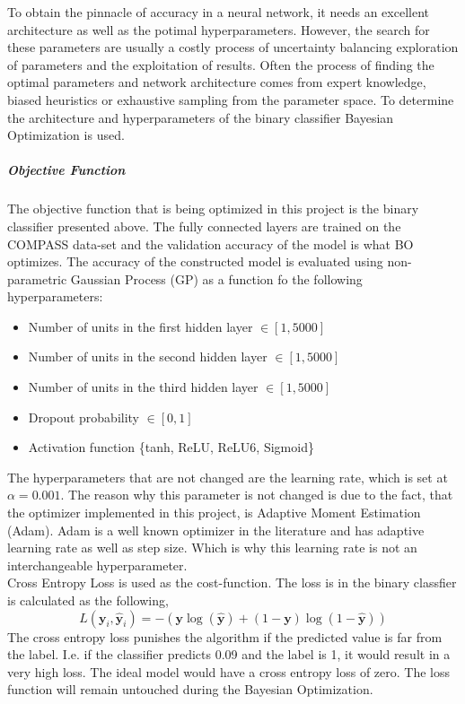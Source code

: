 \documentclass[11pt, fleqn, titlepage]{article}
\begin{document}
	To obtain the pinnacle of accuracy in a neural network, it needs an excellent architecture as well as the potimal hyperparameters. However, the search for these parameters are usually a costly process of uncertainty balancing exploration of parameters and the exploitation of results. Often the process of finding the optimal parameters and network architecture comes from expert knowledge, biased heuristics or exhaustive sampling from the parameter space. To determine the architecture and hyperparameters of the binary classifier Bayesian Optimization is used. 
	\subparagraph*{Objective Function}
	The objective function that is being optimized in this project is the binary classifier presented above. The fully connected layers are trained on the COMPASS data-set and the validation accuracy of the model is what BO optimizes. The accuracy of the constructed model is evaluated using non-parametric Gaussian Process (GP) as a function fo the following hyperparameters:
	\begin{itemize}
		\item Number of units in the first hidden layer \(\in [1, 5000]\) 
		\item Number of units in the second hidden layer \(\in [1, 5000]\) 
		\item Number of units in the third hidden layer \(\in [1, 5000]\)
		\item Dropout probability \(\in [0,1]\)
		\item Activation function \{tanh, ReLU, ReLU6, Sigmoid\}
	\end{itemize}
	The hyperparameters that are not changed are the learning rate, which is set at $ \alpha = 0.001 $. The reason why this parameter is not changed is due to the fact, that the optimizer implemented in this project, is Adaptive Moment Estimation (Adam). Adam is a well known optimizer in the literature and has adaptive learning rate as well as step size. Which is why this learning rate is not an interchangeable hyperparameter. \\ Cross Entropy Loss is used as the cost-function. The loss is in the binary classfier is calculated as the following, 
	\begin{equation}\label{key}
	L\left(\boldsymbol{y}_{i}, \hat{\boldsymbol{y}}_{i}\right) = -(\mathbf y \log (\mathbf {\hat y})+(1-\mathbf  y) \log (1-\mathbf {\hat y}))
	\end{equation}
	The cross entropy loss punishes the algorithm if the predicted value is far from the label. I.e. if the classifier predicts 0.09 and the label is 1, it would result in a very high loss. The ideal model would have a cross entropy loss of zero. The loss function will remain untouched during the Bayesian Optimization. \cite {dl}
\end{document}
